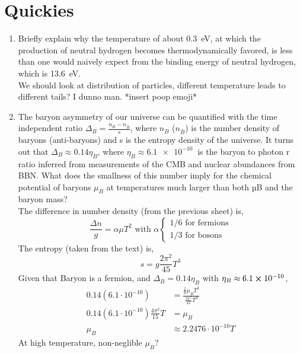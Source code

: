 \section{Quickies}
\begin{enumerate}[label=\alph*)]
	\item Briefly explain why the temperature of about \SI{0.3}{eV}, at which the production of neutral hydrogen becomes thermodynamically favored, is less than one would naively expect from the binding energy of neutral hydrogen, which is \SI{13.6}{eV}.\\
	We should look at distribution of particles, different temperature leads to different tails? I dunno man. *insert poop emoji*
	
	\item The baryon asymmetry of our universe can be quantified with the time independent	ratio $\Delta_B = \frac{n_B - n_{\bar{B}} }{s} $, where $n_B$ ($n_{\bar{B}}$) is the number density of baryons (anti-baryons)	and s is the entropy density of the universe. It turns out that $\Delta_B \approx 0.14 \eta_B$, where $\eta_B \approx \SI{6.1e-10}{}$ is the baryon to photon r ratio inferred from measurements of the	CMB and nuclear abundances from BBN. What does the smallness of this number imply for the chemical potential of baryons $\mu_B$ at temperatures much larger than both µB and the baryon mass? \\
	
	The difference in number density (from the previous sheet) is,
	\begin{equation}
	\frac{\Delta n }{g} = \alpha \mu T^2 \text{ with } \alpha \begin{cases} 1/6 \text{ for fermions} \\ 1/3 \text{ for bosons} \end{cases}
	\end{equation}
	The entropy (taken from the text) is,
	\begin{equation}
	s = g \frac{2\pi^2}{45}T^3
	\end{equation}
	Given that Baryon is a fermion, and $\Delta_B = 0.14 \eta_B$ with $\eta_B \approx 6.1 \cross 10^{-10}$,
	\begin{align*}
	0.14 (6.1 \cdot 10^{-10} ) &= \frac{ \frac{1}{6} \mu_B T^2}{\frac{2\pi^2}{45}T^3} \\
	0.14 (6.1 \cdot 10^{-10}) \frac{4\pi^2}{15}T	&= \mu_B \\
	\mu_B &\approx 2.2476 \cdot 10^{-10} T
	\end{align*}
	At high temperature, non-neglible $\mu_B$?
\end{enumerate}